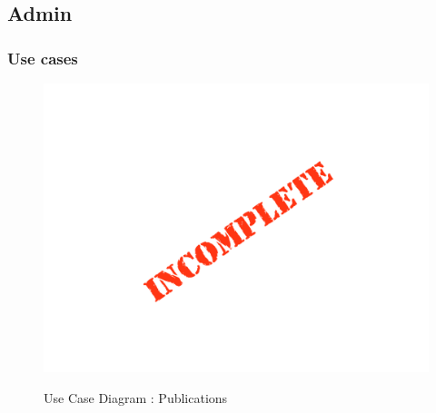\documentclass{article}
\begin{document}
	\subsection{Admin}

	\subsubsection{Use cases}

	\begin{figure}[H]
	\includegraphics[width=\textwidth]{images/Incomplete.png}  \\
	\caption{Use Case Diagram : Publications}
	\end{figure}
\end{document}
